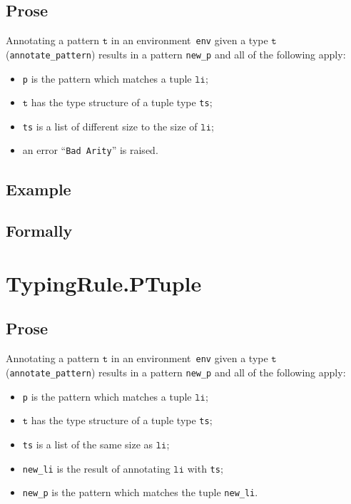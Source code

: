 \documentclass{book}
\newcommand\vt[0]{\texttt{t}}
\newcommand\vli[0]{\texttt{li}}
\begin{document}
\begin{itemize}
  \subsection{Prose}
   Annotating a pattern $\vt$ in an environment~\texttt{env} given a type $\vt$ (\texttt{annotate\_pattern}) results in a pattern \texttt{new\_p} and all of the following apply:
   \begin{itemize}
   \item \texttt{p} is the pattern which matches a tuple $\vli$;
   \item $\vt$ has the type structure of a tuple type \texttt{ts};
   \item \texttt{ts} is a list of different size to the size of $\vli$;
   \item an error ``\texttt{Bad Arity}'' is raised.
   \end{itemize}

  \subsection{Example}



\begin{emptyformal}
    \subsection{Formally}
\end{emptyformal}



\section{TypingRule.PTuple \label{sec:TypingRule.PTuple}}

  \subsection{Prose}
   Annotating a pattern $\vt$ in an environment~\texttt{env} given a type $\vt$ (\texttt{annotate\_pattern}) results in a pattern \texttt{new\_p} and all of the following apply:
   \begin{itemize}
   \item \texttt{p} is the pattern which matches a tuple $\vli$;
   \item $\vt$ has the type structure of a tuple type \texttt{ts};
   \item \texttt{ts} is a list of the same size as $\vli$;
   \item \texttt{new\_li} is the result of annotating $\vli$ with \texttt{ts};
   \item \texttt{new\_p} is the pattern which matches the tuple \texttt{new\_li}.
   \end{itemize}


\end{itemize}
\end{document}
